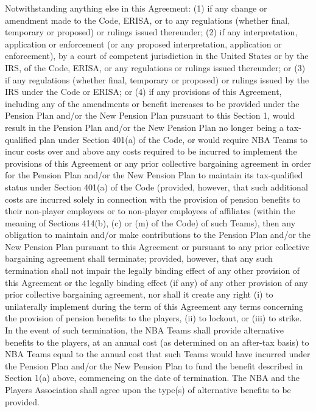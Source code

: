\documentclass[
]{book}
\begin{document}
\begin{enumerate}
  Notwithstanding anything else in this Agreement: (1) if any change or amendment made to the Code, ERISA, or to any regulations (whether final, temporary or proposed) or rulings issued thereunder; (2) if any interpretation, application or enforcement (or any proposed interpretation, application or enforcement), by a court of competent jurisdiction in the United States or by the IRS, of the Code, ERISA, or any regulations or rulings issued thereunder; or (3) if any regulations (whether final, temporary or proposed) or rulings issued by the IRS under the Code or ERISA; or (4) if any provisions of this Agreement, including any of the amendments or benefit increases to be provided under the Pension Plan and/or the New Pension Plan pursuant to this Section 1, would result in the Pension Plan and/or the New Pension Plan no longer being a tax-qualified plan under Section 401(a) of the Code, or would require NBA Teams to incur costs over and above any costs required to be incurred to implement the provisions of this Agreement or any prior collective bargaining agreement in order for the Pension Plan and/or the New Pension Plan to maintain its tax-qualified status under Section 401(a) of the Code (provided, however, that such additional costs are incurred solely in connection with the provision of pension benefits to their non-player employees or to non-player employees of affiliates (within the meaning of Sections 414(b), (c) or (m) of the Code) of such Teams), then any obligation to maintain and/or make contributions to the Pension Plan and/or the New Pension Plan pursuant to this Agreement or pursuant to any prior collective bargaining agreement shall terminate; provided, however, that any such termination shall not impair the legally binding effect of any other provision of this Agreement or the legally binding effect (if any) of any other provision of any prior collective bargaining agreement, nor shall it create any right (i) to unilaterally implement during the term of this Agreement any terms concerning the provision of pension benefits to the players, (ii) to lockout, or (iii) to strike. In the event of such termination, the NBA Teams shall provide alternative benefits to the players, at an annual cost (as determined on an after-tax basis) to NBA Teams equal to the annual cost that such Teams would have incurred under the Pension Plan and/or the New Pension Plan to fund the benefit described in Section 1(a) above, commencing on the date of termination. The NBA and the Players Association shall agree upon the type(s) of alternative benefits to be provided.

\end{enumerate}
\end{document}

